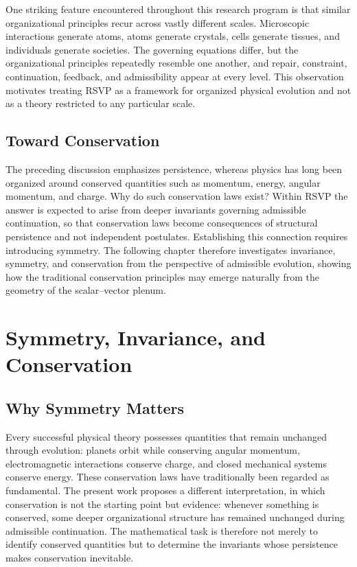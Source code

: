 \documentclass[11pt,oneside]{book}
\numberwithin{equation}{chapter}
\theoremstyle{definition}
\theoremstyle{plain}
\begin{document}
One striking feature encountered throughout this research program is that similar organizational principles recur across vastly different scales. Microscopic interactions generate atoms, atoms generate crystals, cells generate tissues, and individuals generate societies. The governing equations differ, but the organizational principles repeatedly resemble one another, and repair, constraint, continuation, feedback, and admissibility appear at every level. This observation motivates treating RSVP as a framework for organized physical evolution and not as a theory restricted to any particular scale.

\section{Toward Conservation}

The preceding discussion emphasizes persistence, whereas physics has long been organized around conserved quantities such as momentum, energy, angular momentum, and charge. Why do such conservation laws exist? Within RSVP the answer is expected to arise from deeper invariants governing admissible continuation, so that conservation laws become consequences of structural persistence and not independent postulates. Establishing this connection requires introducing symmetry. The following chapter therefore investigates invariance, symmetry, and conservation from the perspective of admissible evolution, showing how the traditional conservation principles may emerge naturally from the geometry of the scalar--vector plenum.

\chapter{Symmetry, Invariance, and Conservation}

\section{Why Symmetry Matters}

Every successful physical theory possesses quantities that remain unchanged through evolution: planets orbit while conserving angular momentum, electromagnetic interactions conserve charge, and closed mechanical systems conserve energy. These conservation laws have traditionally been regarded as fundamental. The present work proposes a different interpretation, in which conservation is not the starting point but evidence: whenever something is conserved, some deeper organizational structure has remained unchanged during admissible continuation. The mathematical task is therefore not merely to identify conserved quantities but to determine the invariants whose persistence makes conservation inevitable.
\end{document}
